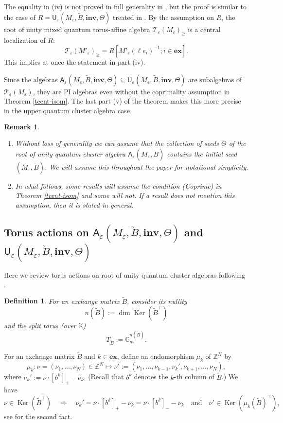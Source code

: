 \documentclass[11pt]{amsart}
\theoremstyle{plain}
\newtheorem{definition}[theorem]{Definition}
\newtheorem{remark}[theorem]{Remark}
\newcommand \bde[1] { \begin{definition}\label{d#1}\rm }
\newcommand \bre[1] { \begin{remark}\label{r#1}\rm }
\newcommand {\ede} { \end{definition} }
\newcommand {\ere} { \end{remark} }
\newcommand \thref[1]{Theorem \ref{t#1}}
\def \KK {{\mathbb C}}
\def \KK {{\mathbb K}}
\def \Gset {{\mathbb G}}
\def \Zset {{\mathbb Z}}
\def \A {{\boldsymbol{\mathsf A}}}
\def \U {{\boldsymbol{\mathsf U}}}
\def \B  {{\widetilde{B}}}
\newcommand \ex {{\mathbf{ex}}}
\newcommand \inv {{\mathbf{inv}}}
\def \TT {{\mathcal{T}}}
\def \ep {\varepsilon}
\def \mt  {\mapsto}
\DeclareMathOperator \Ker { {\mathrm{Ker}} }
\begin{document}
The equality in (iv) is not proved in full generality in \cite[Lemma 3.3]{HLY}, but the proof is similar to the case of $R=\U_\ep(M_\ep, \B, \inv,\Theta)$ treated in \cite{HLY}. By the assumption on $R$, the root of unity mixed quantum torus-affine algebra 
$\TT_\ep(M_\ep)_\geq$ is a central localization of 
$R$:
\[
\TT_\ep(M'_\ep)_\geq = R[M'_\ep(\ell e_i)^{-1} ; i \in \ex].
\]
This implies at once the statement in part (iv). 

Since the algebras $\A_\ep(M_\ep,\B,\inv, \Theta) \subseteq \U_\ep(M_\ep,\B,\inv, \Theta)$
are subalgebras of $\TT_\ep(M_\ep)$, they are PI algebras \cite[Theorem A(1)]{NTY2} even without the coprimality assumption in \thref{cent-isom}. The last part (v) of the theorem makes this more precise in the upper quantum cluster algebra case. 

\bre{coprimality} \hfill
\begin{enumerate}
\item[(i)] Without loss of generality we can assume that the collection of seeds $\Theta$ of the root of unity quantum cluster algebra $\A_\ep(M_\ep, \B)$ contains the initial seed
$(M_\ep, \B)$. We will assume this throughout the paper for notational simplicity. 
\item[(ii)] In what follows, some results will assume the condition (Coprime) in \thref{cent-isom} and some will not. If a result does not mention this assumption, then it is stated in general.
\end{enumerate}
\ere
\subsection{Torus actions on $\A_\ep(M_\ep, \B, \inv, \Theta)$ and $\U_\ep(M_\ep, \B, \inv, \Theta)$}
\label{2.3}
Here we review torus actions on root of unity quantum cluster algebras following \cite[Sect. 3.3]{MNTY}. 

\bde{nB} For an exchange matrix $\B$, consider its nullity
\[
n(\B) := \dim \Ker(\B^\top)
\]
and the split torus (over $\KK$)
\begin{equation}
\label{TB}
T_{\B} := \Gset_m^{n(\B)}.
\end{equation}
\ede

For an exchange matrix $\B$ and $k\in \ex$, define an endomorphism $\mu_k$ of $\Zset^N$ by
\begin{equation}
\label{muKer}
\mu_k: \nu =(\nu_1, \dots, \nu_N) \in \Zset^N
\mt \nu':= (\nu_1, \dots,\nu_{k-1}, \nu_k', \nu_{k+1}, \dots, \nu_N), 
\end{equation}
where $\nu_k' := \nu\cdot[b^k]_+ - \nu_k$.
(Recall that $b^k$ denotes the $k$-th column of $\B$.) 
We have 
\begin{equation}
\label{muk-pm}
\nu \in \Ker(\B^\top)
\quad \Rightarrow \quad 
\nu_k' = \nu\cdot[b^k]_+ - \nu_k = 
\nu\cdot[b^k]_- - \nu_k \quad \mbox{and} \quad 
\nu' \in \Ker ( \mu_k (\B)^\top),
\end{equation}
see \cite[Lemma 2.3]{GSV} for the second fact. 
\end{document}
